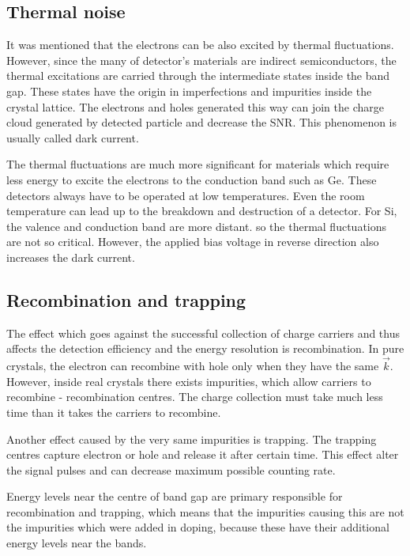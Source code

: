 \subsection{Thermal noise}

It was mentioned that the electrons can be also excited by thermal fluctuations. However, since the many of detector's materials are indirect semiconductors, the thermal excitations are carried through the intermediate states inside the band gap. These states have the origin in imperfections and impurities inside the crystal lattice. The electrons and holes generated this way can join the charge cloud generated by detected particle and decrease the SNR. This phenomenon is usually called dark current.

\par
The thermal fluctuations are much more significant for materials which require less energy to excite the electrons to the conduction band such as Ge. These detectors always have to be operated at low temperatures. Even the room temperature can lead up to the breakdown and destruction of a detector. For Si, the valence and conduction band are more distant. so the thermal fluctuations are not so critical.
However, the applied bias voltage in reverse direction also increases the dark current.


\subsection{Recombination and trapping}
The effect which goes against the successful collection of charge carriers and thus affects the detection efficiency and the energy resolution is recombination. In pure crystals, the electron can recombine with hole only when they have the same $\vec{k}$. However, inside real crystals there exists impurities, which allow carriers to recombine - recombination centres. The charge collection must take much less time than it takes the carriers to recombine. 
\par
Another effect caused by the very same impurities is trapping. The trapping centres capture electron or hole and release it after certain time. This effect alter the signal pulses and can decrease maximum possible counting rate.
\par
Energy levels near the centre of band gap are primary responsible for recombination and trapping, which means that the impurities causing this are not the impurities which were added in doping, because these have their additional energy levels near the bands. 


